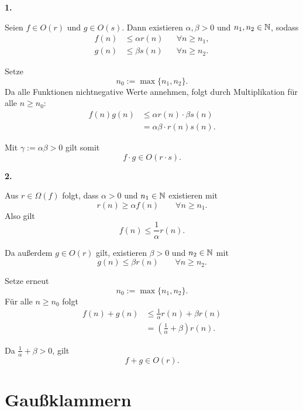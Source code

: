 \documentclass{report}
\begin{document}
\begin{myproof}
  \textbf{1.}

  Seien $f\in O(r)$ und $g\in O(s)$.
  Dann existieren $\alpha,\beta>0$ und
  $n_1,n_2\in\mathbb{N}$, sodass
  \begin{align*}
    f(n)&\le\alpha r(n)
      &&\forall n\ge n_1,\\
    g(n)&\le\beta s(n)
      &&\forall n\ge n_2.
  \end{align*}

  Setze
  \[
    n_0:=\max\{n_1,n_2\}.
  \]
  Da alle Funktionen nichtnegative Werte annehmen,
  folgt durch Multiplikation für alle $n\ge n_0$:
  \begin{align*}
    f(n)g(n)
    &\le\alpha r(n)\cdot\beta s(n)\\
    &=\alpha\beta\cdot r(n)s(n).
  \end{align*}

  Mit $\gamma:=\alpha\beta>0$ gilt somit
  \[
    f\cdot g\in O(r\cdot s).
  \]

  \medskip
  \textbf{2.}

  Aus $r\in\Omega(f)$ folgt, dass
  $\alpha>0$ und $n_1\in\mathbb{N}$ existieren mit
  \[
    r(n)\ge\alpha f(n)
    \qquad\forall n\ge n_1.
  \]
  Also gilt
  \[
    f(n)\le\frac1\alpha r(n).
  \]

  Da außerdem $g\in O(r)$ gilt,
  existieren $\beta>0$ und $n_2\in\mathbb{N}$ mit
  \[
    g(n)\le\beta r(n)
    \qquad\forall n\ge n_2.
  \]

  Setze erneut
  \[
    n_0:=\max\{n_1,n_2\}.
  \]
  Für alle $n\ge n_0$ folgt
  \begin{align*}
    f(n)+g(n)
    &\le\frac1\alpha r(n)+\beta r(n)\\
    &=\left(\frac1\alpha+\beta\right)r(n).
  \end{align*}

  Da $\frac1\alpha+\beta>0$, gilt
  \[
    f+g\in O(r).
  \]
\end{myproof}


\section{Gaußklammern}

\end{document}
